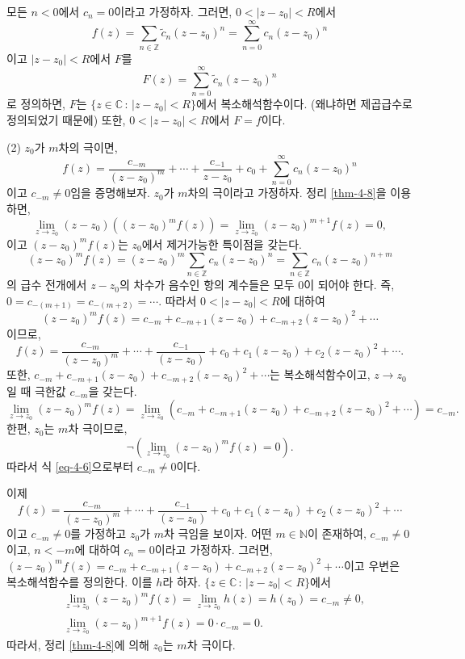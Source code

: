 
모든 $n<0$에서 $c_n=0$이라고 가정하자. 그러면,
$0<|z-z_0|<R$에서
\[
f(z) = \sum_{n\in\mathbb Z} \tilde c_n (z-z_0)^n
= \sum_{n=0}^\infty  c_n (z-z_0)^n
\]
이고 $|z-z_0|<R$에서 $F$를
\[
F(z) = \sum_{n=0}^\infty  \tilde c_n (z-z_0)^n
\]
로 정의하면, $F$는 
$\{ z\in\mathbb C\,:\, |z-z_0|<R\}$에서 복소해석함수이다.
(왜냐하면 제곱급수로 정의되었기 때문에)
또한, $0<|z-z_0|<R$에서 $F=f$이다.

(2) $z_0$가 $m$차의 극이면,
\[
f(z) = \dfrac{c_{-m}}{(z-z_0)^m} + \cdots + \dfrac{c_{-1}}{z-z_0}
+ c_0 + \sum_{n=0}^\infty c_n(z-z_0)^n
\]
이고 $c_{-m} \ne 0$임을 증명해보자.
$z_0$가 $m$차의 극이라고 가정하자.
정리 \ref{thm-4-8}을 이용하면,
\[
\lim_{z\to z_0} (z-z_0)\left( (z-z_0)^m f(z) \right)
= \lim_{z\to z_0} (z-z_0)^{m+1} f(z) =0,
\]
이고 $(z-z_0)^m f(z)$는 $z_0$에서 제거가능한 특이점을 갖는다.
\[
(z-z_0)^mf(z) = (z-z_0)^m \sum_{n\in\mathbb Z}c_n(z-z_0)^n
= \sum_{n\in\mathbb Z}c_n(z-z_0)^{n+m}
\]
의 급수 전개에서 $z-z_0$의 차수가 음수인 항의 계수들은 모두 $0$이 되어야 한다.
즉, $0 = c_{-(m+1)} = c_{-(m+2)} = \cdots$.
따라서 $0<|z-z_0|<R$에 대하여
\begin{equation}\label{eq-4-6}
(z-z_0)^mf(z) = c_{-m} + c_{-m+1}(z-z_0) + c_{-m+2}(z-z_0)^2 + \cdots
\end{equation}
이므로,
\[
f(z) = \dfrac{c_{-m}}{(z-z_0)^m} + \cdots + \dfrac{c_{-1}}{(z-z_0)}
+ c_0 + c_1(z-z_0) + c_2(z-z_0)^2 + \cdots.
\]
또한, 
$c_{-m} + c_{-m+1}(z-z_0) + c_{-m+2}(z-z_0)^2 + \cdots$는 
복소해석함수이고, $z\to z_0$일 때 극한값 $c_{-m}$을 갖는다.
\[
\lim_{z\to z_0} (z-z_0)^mf(z) 
= \lim_{z\to z_0}  \left( 
c_{-m} + c_{-m+1}(z-z_0) + c_{-m+2}(z-z_0)^2 + \cdots \right) = c_{-m}.
\]
한편, $z_0$는 $m$차 극이므로, 
\[
\neg \left( \lim_{z\to z_0} (z-z_0)^mf(z) =0 \right).
\]
따라서 식 \eqref{eq-4-6}으로부터 $c_{-m} \ne 0$이다.

이제 
\[
f(z) = \dfrac{c_{-m}}{(z-z_0)^m} + \cdots + \dfrac{c_{-1}}{(z-z_0)}
+ c_0 + c_1(z-z_0) + c_2(z-z_0)^2 + \cdots
\]
이고 $c_{-m} \ne 0$를 가정하고 $z_0$가 $m$차 극임을 보이자.
어떤 $m\in \mathbb N$이 존재하여,
$c_{-m} \ne 0$이고, $n<-m$에 대하여 $c_n=0$이라고 가정하자.
그러면, 
$(z-z_0)^mf(z) = c_{-m} + c_{-m+1}(z-z_0) + c_{-m+2}(z-z_0)^2 + \cdots$이고
우변은 복소해석함수를 정의한다. 이를 $h$라 하자.
$\{z \in \mathbb C\,:\, |z-z_0| <R\}$에서
\begin{align*}
& \lim_{z\to z_0} (z-z_0)^m f(z) = \lim_{z\to z_0} h(z) = h(z_0) = c_{-m} \ne0,\\
& \lim_{z\to z_0} (z-z_0)^{m+1}f(z) = 0 \cdot c_{-m} = 0.
\end{align*}
따라서, 정리 \ref{thm-4-8}에 의해 $z_0$는 $m$차 극이다.


